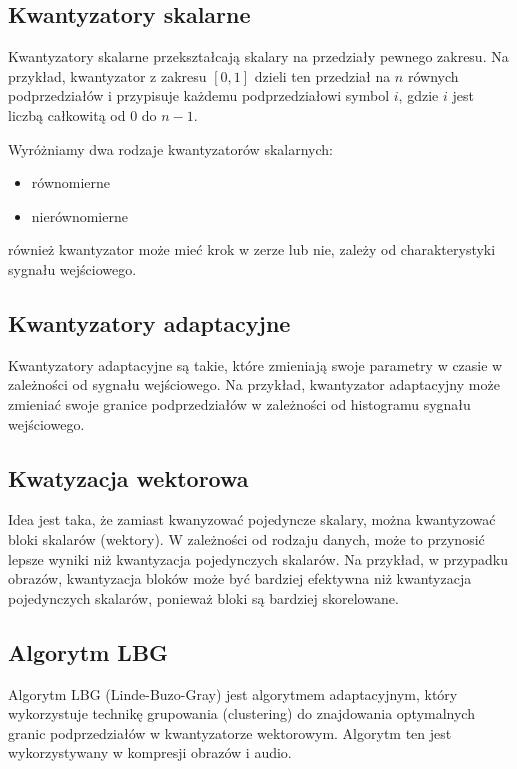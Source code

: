 \documentclass{../notatki}
\begin{document}
\subsection{Kwantyzatory skalarne}

Kwantyzatory skalarne przekształcają skalary na przedziały pewnego zakresu.
Na przykład, kwantyzator z zakresu $[0, 1]$ dzieli ten przedział na $n$ równych
podprzedziałów i przypisuje każdemu podprzedziałowi symbol $i$, gdzie $i$ jest
liczbą całkowitą od $0$ do $n - 1$.

Wyróżniamy dwa rodzaje kwantyzatorów skalarnych:
\begin{itemize}
  \item równomierne
  \item nierównomierne
\end{itemize}
również kwantyzator może mieć krok w zerze lub nie, zależy od charakterystyki
sygnału wejściowego.

\subsection{Kwantyzatory adaptacyjne}

Kwantyzatory adaptacyjne są takie, które zmieniają swoje parametry w czasie
w zależności od sygnału wejściowego. Na przykład, kwantyzator adaptacyjny
może zmieniać swoje granice podprzedziałów w zależności od histogramu sygnału
wejściowego.

\subsection{Kwatyzacja wektorowa}

Idea jest taka, że zamiast kwanyzować pojedyncze skalary, można kwantyzować
bloki skalarów (wektory). W zależności od rodzaju danych, może to przynosić
lepsze wyniki niż kwantyzacja pojedynczych skalarów. Na przykład, w przypadku
obrazów, kwantyzacja bloków może być bardziej efektywna niż
kwantyzacja pojedynczych
skalarów, ponieważ bloki są bardziej skorelowane.

\subsection{Algorytm LBG}

Algorytm LBG (Linde-Buzo-Gray) jest algorytmem adaptacyjnym, który wykorzystuje
technikę grupowania (clustering) do znajdowania optymalnych granic
podprzedziałów
w kwantyzatorze wektorowym. Algorytm ten jest wykorzystywany w kompresji obrazów
i audio.
\end{document}
